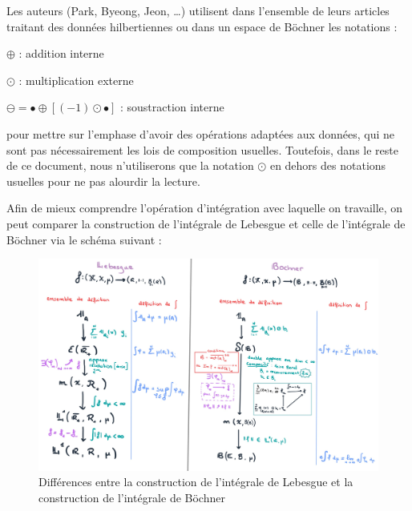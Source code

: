 {    

    Les auteurs (Park, Byeong, Jeon, \dots) utilisent dans l'ensemble de leurs articles traitant des données hilbertiennes ou dans un espace de Böchner les notations :
    \begin{todolist}
        \item $\oplus$ : addition interne
        \item $\odot$  : multiplication externe
        \item $\ominus = \bullet \oplus [(-1) \odot \bullet ]$ : soustraction interne
    \end{todolist}

    \smallskip

    \noindent pour mettre sur l'emphase d'avoir des opérations adaptées aux données, qui ne sont pas nécessairement les lois de composition usuelles. Toutefois, dans le reste de ce document, nous n'utiliserons que la notation $\odot$ en dehors des notations usuelles pour ne pas alourdir la lecture.

    \bigskip

    \noindent Afin de mieux comprendre l'opération d'intégration avec laquelle on travaille, on peut comparer la construction de l'intégrale de Lebesgue et celle de l'intégrale de Böchner via le schéma suivant :
    
    \begin{figure}[H]
        \centering
        \includegraphics[width=\textwidth]{Images/bochner_vs_leb.jpeg}
        \caption{Différences entre la construction de l'intégrale de Lebesgue et la construction de l'intégrale de Böchner}
        \label{fig:boch-vs-leb}
    \end{figure}

    
    
    
}



